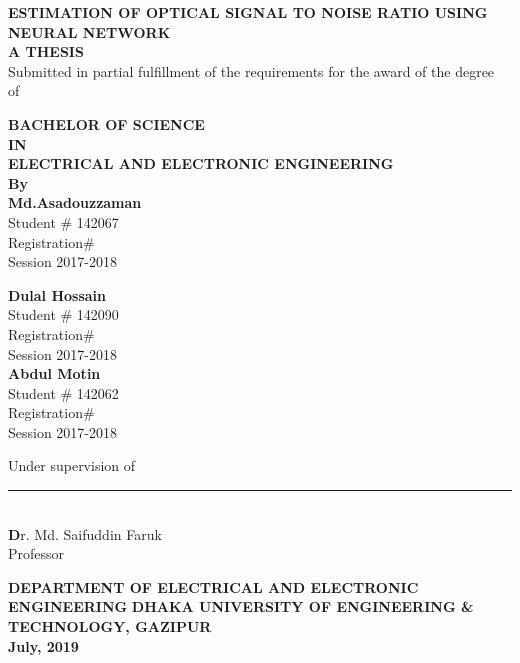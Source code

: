 \documentclass[12pt]{report}
\begin{document}
	\begin{titlepage}
	\begin{center}
		\LARGE {\bfseries {ESTIMATION OF OPTICAL SIGNAL TO NOISE RATIO USING NEURAL NETWORK}}\\
		\vspace{1cm}
		{\fontsize{12}{0} \bfseries {A THESIS}}\\
		
		{\normalsize  {Submitted in partial fulfillment of the requirements for the award of the degree\\of}}
		
		{\fontsize{12}{0} \bfseries {BACHELOR OF SCIENCE}}\\
		{\fontsize{12}{0} \bfseries {IN}}\\
		{\fontsize{12}{0} \bfseries {ELECTRICAL AND ELECTRONIC ENGINEERING}}\\
		{\fontsize{12}{0} \bfseries {By}}\\
		
		{\normalsize 
		\textbf{Md.Asadouzzaman}\\
		Student \# 142067\\
		Registration\# \\
		Session 2017-2018\\}
		\begin{multicols}{2}
			\normalsize 
				\textbf{Dulal Hossain}\\
				Student \# 142090\\
				Registration\# \\
				Session 2017-2018\\
				\textbf{Abdul Motin}\\
				Student \# 142062\\
				Registration\# \\
				Session 2017-2018\\
		\end{multicols}
		\vspace{1cm}
		{\normalsize 
			Under supervision of\\\vspace{1cm}
			\rule{5cm}{.1cm}\\
			\textbf Dr. Md. Saifuddin Faruk\\
			Professor\\}
		\vspace{0.5cm}
		{\fontsize{12}{0} \bfseries {DEPARTMENT OF ELECTRICAL AND ELECTRONIC ENGINEERING}}
		{\fontsize{13}{0} \bfseries {DHAKA UNIVERSITY OF ENGINEERING \& TECHNOLOGY, GAZIPUR}}\\
		{\fontsize{12}{0} \textbf{July, 2019}}
	\end{center}
\end{titlepage}
\end{document}
